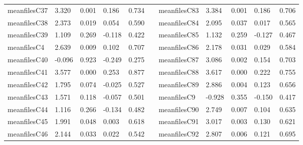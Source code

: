 \begin{table}[h!]
\begin{tabular}{lllllllllll}
meanfilesC37  & 3.320            & 0.001            & 0.186               & 0.734               &           & meanfilesC83  & 3.384            & 0.001            & 0.186               & 0.706               \\
meanfilesC38  & 2.373            & 0.019            & 0.054               & 0.590               &           & meanfilesC84  & 2.095            & 0.037            & 0.017               & 0.565               \\
meanfilesC39  & 1.109            & 0.269            & -0.118              & 0.422               &           & meanfilesC85  & 1.132            & 0.259            & -0.127              & 0.467               \\
meanfilesC4   & 2.639            & 0.009            & 0.102               & 0.707               &           & meanfilesC86  & 2.178            & 0.031            & 0.029               & 0.584               \\
meanfilesC40  & -0.096           & 0.923            & -0.249              & 0.275               &           & meanfilesC87  & 3.086            & 0.002            & 0.154               & 0.703               \\
meanfilesC41  & 3.577            & 0.000            & 0.253               & 0.877               &           & meanfilesC88  & 3.617            & 0.000            & 0.222               & 0.755               \\
meanfilesC42  & 1.795            & 0.074            & -0.025              & 0.527               &           & meanfilesC89  & 2.886            & 0.004            & 0.123               & 0.656               \\
meanfilesC43  & 1.571            & 0.118            & -0.057              & 0.501               &           & meanfilesC9   & -0.928           & 0.355            & -0.150              & 0.417               \\
meanfilesC44  & 1.116            & 0.266            & -0.134              & 0.482               &           & meanfilesC90  & 2.749            & 0.007            & 0.104               & 0.635               \\
meanfilesC45  & 1.991            & 0.048            & 0.003               & 0.618               &           & meanfilesC91  & 3.017            & 0.003            & 0.130               & 0.621               \\
meanfilesC46  & 2.144            & 0.033            & 0.022               & 0.542               &           & meanfilesC92  & 2.807            & 0.006            & 0.121               & 0.695               \\

\end{tabular}
\end{table}
